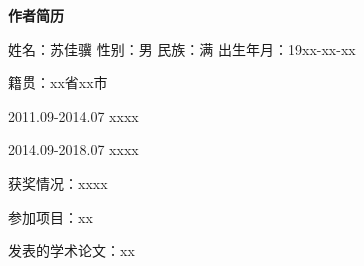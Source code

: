 \begin{center}
    { \hwfs\textbf{作者简历} }
\end{center}

\begin{spacing}{1.5}
    {  \fangsong
    姓名：苏佳骥 \quad 
    性别：男\quad   
    民族：满 \quad  
    出生年月：19xx-xx-xx 
    
    籍贯：xx省xx市

    2011.09-2014.07   xxxx

    2014.09-2018.07   xxxx

    获奖情况：xxxx

    参加项目：xx

    发表的学术论文：xx
    
    }
\end{spacing}
\newpage